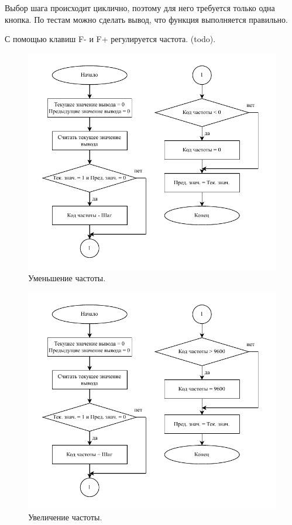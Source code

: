 	Выбор шага происходит циклично, поэтому для него требуется только одна кнопка. По тестам можно сделать вывод, что функция выполняется правильно. 
	
	С помощью клавиш F- и F+ регулируется частота.  (todo).
	
	\begin{figure}[H]
    \centering
    \includegraphics[width=1\textwidth]{../image/minus_freq.pdf}
    \caption{Уменьшение частоты.}
	\end{figure}	
	
	\begin{figure}[H]
    \centering
    \includegraphics[width=1\textwidth]{../image/plus_freq.pdf}
    \caption{Увеличение частоты.}
	\end{figure}	
	
